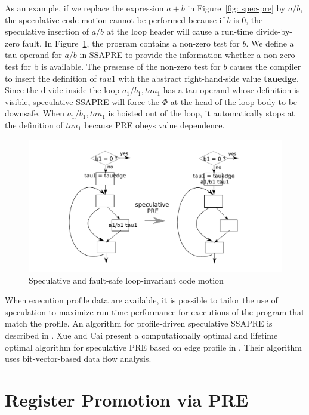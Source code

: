 As an example, if we replace the expression $a+b$ in Figure~\ref{fig: spec-pre}
by $a/b$, the speculative code motion cannot be performed because if $b$ is 0,
the speculative insertion of $a/b$ at the loop header will cause a run-time
divide-by-zero fault.  In Figure~\ref{fig: spec-div}, the program contains a 
non-zero test for $b$.  We define a tau operand for $a/b$ in SSAPRE to
provide the information whether a non-zero test for b is available.  The
presense of the non-zero test for $b$ causes the compiler to insert the
definition of $tau1$ with the abstract right-hand-side value {\bf tauedge}.
Since the divide inside the loop $a_1/b_1,tau_1$ has a tau operand whose
definition is visible, speculative SSAPRE will force the $\Phi$ at the head
of the loop body to be downsafe.  When $a_1/b_1,tau_1$ is hoisted out of the
loop, it automatically stops at the definition of $tau_1$ because PRE obeys
value dependence.

\begin{figure}
\centering
\includegraphics[scale=0.55]{fig-spec-div.pdf}
\caption{Speculative and fault-safe loop-invariant code motion}
\label{fig: spec-div}
\end{figure}

When execution profile data are available, it is possible to tailor the use
of speculation to maximize run-time performance for executions of the program
that match the profile.  An algorithm for profile-driven speculative SSAPRE
is described in \cite{Lo98}.  Xue and Cai present a computationally optimal
and lifetime optimal algorithm
for speculative PRE based on edge profile in \cite{Xue06}.  Their algorithm
uses bit-vector-based data flow analysis.

\section{Register Promotion via PRE}

